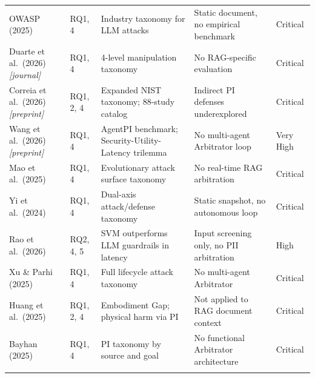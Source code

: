 \documentclass[12pt, a4paper]{article}
\begin{document}
\begin{small}
\begin{longtable}{L{3cm} C{1.2cm} L{3.5cm} L{3.5cm} C{1.5cm}}
OWASP (2025) & RQ1, 4 & Industry taxonomy for LLM attacks & Static document, no empirical benchmark & Critical \\
Duarte et al.\ (2026) \emph{[journal]} & RQ1, 4 & 4-level manipulation taxonomy & No RAG-specific evaluation & Critical \\
Correia et al.\ (2026) \emph{[preprint]} & RQ1, 2, 4 & Expanded NIST taxonomy; 88-study catalog & Indirect PI defenses underexplored & Critical \\
Wang et al.\ (2026) \emph{[preprint]} & RQ1, 4 & AgentPI benchmark; Security-Utility-Latency trilemma & No multi-agent Arbitrator loop & Very High \\
Mao et al.\ (2025) & RQ1, 4 & Evolutionary attack surface taxonomy & No real-time RAG arbitration & Critical \\
Yi et al.\ (2024) & RQ1, 4 & Dual-axis attack/defense taxonomy & Static snapshot, no autonomous loop & Critical \\
Rao et al.\ (2026) & RQ2, 4, 5 & SVM outperforms LLM guardrails in latency & Input screening only, no PII arbitration & High \\
Xu \& Parhi (2025) & RQ1, 4 & Full lifecycle attack taxonomy & No multi-agent Arbitrator & Critical \\
Huang et al.\ (2025) & RQ1, 2, 4 & Embodiment Gap; physical harm via PI & Not applied to RAG document context & Critical \\
Bayhan (2025) & RQ1, 4 & PI taxonomy by source and goal & No functional Arbitrator architecture & Critical \\

\midrule
{}
 \\
\midrule


\end{longtable}
\end{small}
\end{document}
